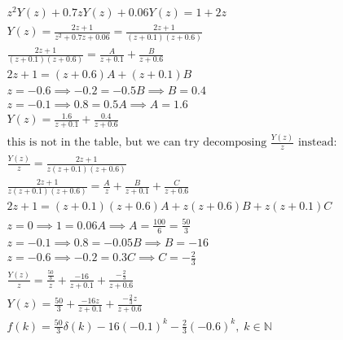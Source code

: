 \documentclass[12pt]{article}
\newcommand{\N}{\mathbb{N}}
\newenvironment{problem}[2][Problem]{\begin{trivlist}
\item[\hskip \labelsep {\bfseries #1}\hskip \labelsep {\bfseries #2.}]}{\end{trivlist}}
\begin{document}
\begin{problem}{2}
\begin{enumerate}[label=\alph*.]
        \begin{align*}
            z^2Y(z)+0.7zY(z)+0.06Y(z)=1+2z\\
            Y(z)=\frac{2z+1}{z^2+0.7z+0.06}=\frac{2z+1}{(z+0.1)(z+0.6)}\\
            \frac{2z+1}{(z+0.1)(z+0.6)} = \frac{A}{z+0.1}+\frac{B}{z+0.6}\\
            2z+1=(z+0.6)A+(z+0.1)B\\
            z=-0.6\implies -0.2 = -0.5B \implies B=0.4\\
            z=-0.1\implies 0.8=0.5A \implies A = 1.6\\
            Y(z) = \frac{1.6}{z+0.1}+\frac{0.4}{z+0.6}\\
            \text{this is not in the table, but we can try decomposing $\frac{Y(z)}{z}$ instead:}\\
            \frac{Y(z)}{z}=\frac{2z+1}{z(z+0.1)(z+0.6)}\\
            \frac{2z+1}{z(z+0.1)(z+0.6)} = \frac{A}{z} + \frac{B}{z+0.1}+\frac{C}{z+0.6}\\
            2z+1=(z+0.1)(z+0.6)A+z(z+0.6)B+z(z+0.1)C\\
            z=0\implies 1 = 0.06A \implies A = \frac{100}{6}=\frac{50}{3}\\
            z=-0.1\implies 0.8 = -0.05B \implies B = -16\\
            z=-0.6\implies -0.2 = 0.3C\implies C = -\frac{2}{3}\\
            \frac{Y(z)}{z}=\frac{\frac{50}{3}}{z} + \frac{-16}{z+0.1} + \frac{-\frac{2}{3}}{z+0.6}\\
            Y(z)=\frac{50}{3} +\frac{-16z}{z+0.1}+\frac{-\frac{2}{3}z}{z+0.6}\\
            f(k)=\frac{50}{3}\delta(k) -16(-0.1)^k-\frac{2}{3}(-0.6)^k,\;k\in \N
        \end{align*}
    \end{enumerate}
\end{problem}
\pagebreak
\end{document}
